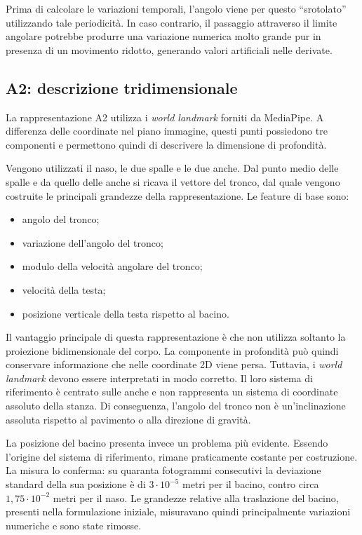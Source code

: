 Prima di calcolare le variazioni temporali, l'angolo viene per questo ``srotolato'' utilizzando tale periodicità. In caso contrario, il passaggio attraverso il limite angolare potrebbe produrre una variazione numerica molto grande pur in presenza di un movimento ridotto, generando valori artificiali nelle derivate.

\subsection{A2: descrizione tridimensionale}

La rappresentazione A2 utilizza i \emph{world landmark} forniti da MediaPipe. A differenza delle coordinate nel piano immagine, questi punti possiedono tre componenti e permettono quindi di descrivere la dimensione di profondità.

Vengono utilizzati il naso, le due spalle e le due anche. Dal punto medio delle spalle e da quello delle anche si ricava il vettore del tronco, dal quale vengono costruite le principali grandezze della rappresentazione.
Le feature di base sono:
\begin{itemize}
    \item angolo del tronco;
    \item variazione dell'angolo del tronco;
    \item modulo della velocità angolare del tronco;
    \item velocità della testa;
    \item posizione verticale della testa rispetto al bacino.
\end{itemize}

Il vantaggio principale di questa rappresentazione è che non utilizza soltanto la proiezione bidimensionale del corpo. La componente in profondità può quindi conservare informazione che nelle coordinate 2D viene persa.
Tuttavia, i \emph{world landmark} devono essere interpretati in modo corretto. Il loro sistema di riferimento è centrato sulle anche e non rappresenta un sistema di coordinate assoluto della stanza. Di conseguenza, l'angolo del tronco non è un'inclinazione assoluta rispetto al pavimento o alla direzione di gravità.

La posizione del bacino presenta invece un problema più evidente. Essendo l'origine del sistema di riferimento, rimane praticamente costante per costruzione. La misura lo conferma: su quaranta fotogrammi consecutivi la deviazione standard della sua posizione è di $3\cdot10^{-5}$ metri per il bacino, contro circa $1{,}75\cdot10^{-2}$ metri per il naso.
Le grandezze relative alla traslazione del bacino, presenti nella formulazione iniziale, misuravano quindi principalmente variazioni numeriche e sono state rimosse.

